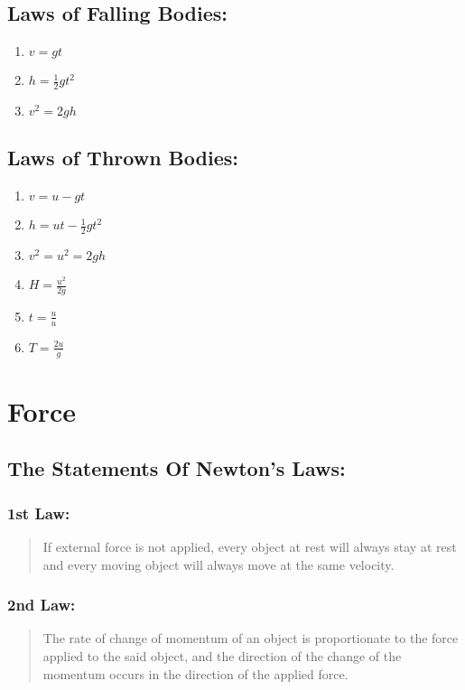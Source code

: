 \documentclass[a4paper]{report}
\begin{document}
    \section{Laws of Falling Bodies: }
            \begin{enumerate}
                \item $ v = gt $
                \item $ h = \frac{1}{2}gt^2 $
                \item $ v^2 = 2gh $
            \end{enumerate}
    \section{Laws of Thrown Bodies: }
    \begin{enumerate}
        \item $ v = u - gt $
        \item $ h = ut - \frac{1}{2}gt^2 $
        \item $ v^2 = u^2 = 2gh $
        \item $ H = \frac{u^2}{2g} $
        \item $ t = \frac{u}{u} $
        \item $ T = \frac{2u}{g}$
    \end{enumerate}



\chapter{Force}
    \section{The Statements Of Newton's Laws: }
        \subsection{1st Law: }
            \begin{quotation}
                \item If external force is not applied, every object at rest will always stay at rest and every moving object will always move at the same velocity.
            \end{quotation}
        \subsection{2nd Law: }
            \begin{quotation}
                \item The rate of change of momentum of an object is proportionate to the force applied to the said object, and the direction of the change of the momentum occurs in the direction of the applied force.
            \end{quotation}
\end{document}
